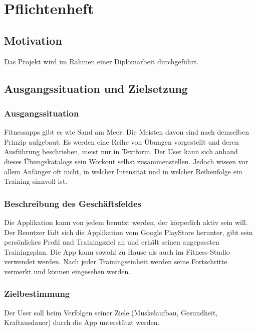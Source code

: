 \documentclass[FIPLY_base.tex]{subfiles}
\begin{document}
	\section{Pflichtenheft}
	
	\subsection{Motivation}
	Das Projekt wird im Rahmen einer Diplomarbeit durchgeführt.
	\subsection{Ausgangssituation und Zielsetzung}
	\subsubsection{Ausgangssituation}
	Fitnessapps gibt es wie Sand am Meer. Die Meisten davon sind nach demselben Prinzip aufgebaut: Es werden eine Reihe von Übungen vorgestellt und deren Ausführung beschrieben, meist nur in Textform. Der User kann sich anhand dieses Übungskatalogs sein Workout selbst zusammenstellen. Jedoch wissen vor allem Anfänger oft nicht, in welcher Intensität und in welcher Reihenfolge ein Training sinnvoll ist. 
	\subsubsection{Beschreibung des Geschäftsfeldes}
	Die Applikation kann von jedem benutzt werden, der körperlich aktiv sein will. Der Benutzer lädt sich die Applikation vom Google PlayStore herunter, gibt sein persönliches Profil und Trainingsziel an und erhält seinen angepassten Trainingsplan. Die App kann sowohl zu Hause als auch im Fitness-Studio verwendet werden. Nach jeder Trainingseinheit werden seine Fortschritte vermerkt und können eingesehen werden.
	
	\subsubsection{Zielbestimmung}
	Der User soll beim Verfolgen seiner Ziele (Muskelaufbau, Gesundheit, Kraftausdauer) durch die App unterstützt werden.
	
\end{document}
